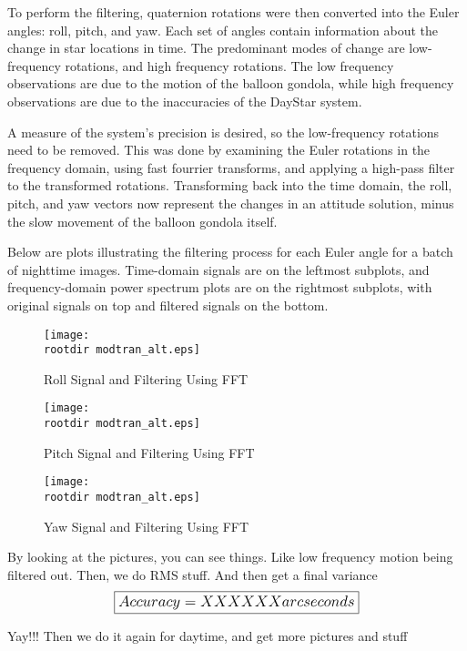 \documentclass[twocolumn,letterpaper]{IEEEAerospace2012}
\newcommand{\rootdir}{./Figures/}
\begin{document}
To perform the filtering, quaternion rotations were then converted into the Euler angles: roll, pitch, and yaw. Each set of angles contain information about the change in star locations in time. The predominant modes of change are low-frequency rotations, and high frequency rotations. The low frequency observations are due to the motion of the balloon gondola, while high frequency observations are due to the inaccuracies of the DayStar system. 

A measure of the system's precision is desired, so the low-frequency rotations need to be removed. This was done by examining the Euler rotations in the frequency domain, using fast fourrier transforms, and applying a high-pass filter to the transformed rotations. Transforming back into the time domain, the roll, pitch, and yaw vectors now represent the changes in an attitude solution, minus the slow movement of the balloon gondola itself. 

Below are plots illustrating the filtering process for each Euler angle for a batch of nighttime images. Time-domain signals are on the leftmost subplots, and frequency-domain power spectrum plots are on the rightmost subplots, with original signals on top and filtered signals on the bottom.


\begin{figure}
    \label{fig:Roll Filtering}
    \texttt{[image: \\rootdir modtran\_alt.eps]}
    \caption{Roll Signal and Filtering Using FFT}
\end{figure}

\begin{figure}
    \label{fig:Pitch Filtering}
    \texttt{[image: \\rootdir modtran\_alt.eps]}
    \caption{Pitch Signal and Filtering Using FFT}
\end{figure}

\begin{figure}
    \label{fig:Yaw Filtering}
    \texttt{[image: \\rootdir modtran\_alt.eps]}
    \caption{Yaw Signal and Filtering Using FFT}
\end{figure}
  
By looking at the pictures, you can see things. Like low frequency motion being filtered out. Then, we do RMS stuff. And then get a final variance
\begin{displaymath}\large
    \boxed{Accuracy = XXXXXX arcseconds}
\end{displaymath}

Yay!!! Then we do it again for daytime, and get more pictures and stuff
\end{document}
